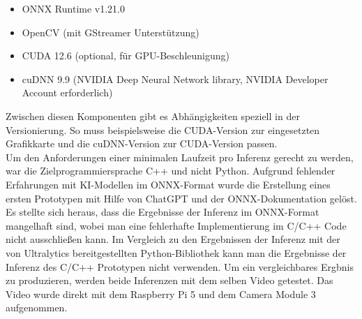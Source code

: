 \begin{itemize}
    \item ONNX Runtime v1.21.0
    \item OpenCV (mit GStreamer Unterstützung)
    \item CUDA 12.6 (optional, für GPU-Beschleunigung)
    \item cuDNN 9.9 (NVIDIA Deep Neural Network library, NVIDIA Developer Account erforderlich)
\end{itemize}

\newpage
Zwischen diesen Komponenten gibt es Abhängigkeiten speziell in der Versionierung. So muss beispielsweise die CUDA-Version zur eingesetzten Grafikkarte und die cuDNN-Version zur CUDA-Version passen. \\ Um den Anforderungen einer minimalen Laufzeit pro Inferenz gerecht zu werden, war die Zielprogrammiersprache C++ und nicht Python. Aufgrund fehlender Erfahrungen mit KI-Modellen im ONNX-Format wurde die Erstellung eines ersten Prototypen mit Hilfe von ChatGPT und der ONNX-Dokumentation gelöst. Es stellte sich heraus, dass die Ergebnisse der Inferenz im ONNX-Format mangelhaft sind, wobei man eine fehlerhafte Implementierung im C/C++ Code nicht ausschließen kann. Im Vergleich zu den Ergebnissen der Inferenz mit der von Ultralytics bereitgestellten Python-Bibliothek kann man die Ergebnisse der Inferenz des C/C++ Prototypen nicht verwenden. Um ein vergleichbares Ergbnis zu produzieren, werden beide Inferenzen mit dem selben Video getestet. Das Video wurde direkt mit dem Raspberry Pi 5 und dem Camera Module 3 aufgenommen.

